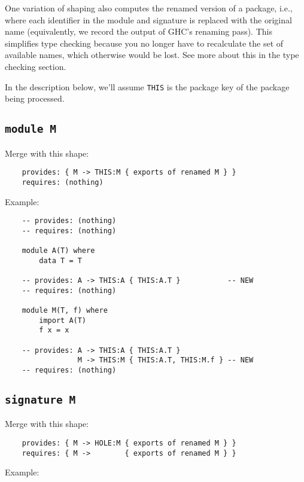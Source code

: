 \documentclass{article}
\begin{document}
One variation of shaping also computes the renamed version of a package,
i.e., where each identifier in the module and signature is replaced with
the original name (equivalently, we record the output of GHC's renaming
pass). This simplifies type checking because you no longer have to
recalculate the set of available names, which otherwise would be lost.
See more about this in the type checking section.

In the description below, we'll assume \verb|THIS| is the package key
of the package being processed.

\newpage

\subsection{\texttt{module M}}

Merge with this shape:

\begin{verbatim}
    provides: { M -> THIS:M { exports of renamed M } }
    requires: (nothing)
\end{verbatim}

\noindent Example:

\begin{verbatim}
    -- provides: (nothing)
    -- requires: (nothing)

    module A(T) where
        data T = T

    -- provides: A -> THIS:A { THIS:A.T }           -- NEW
    -- requires: (nothing)

    module M(T, f) where
        import A(T)
        f x = x

    -- provides: A -> THIS:A { THIS:A.T }
                 M -> THIS:M { THIS:A.T, THIS:M.f } -- NEW
    -- requires: (nothing)
\end{verbatim}

\newpage
\subsection{\texttt{signature M}}

Merge with this shape:

\begin{verbatim}
    provides: { M -> HOLE:M { exports of renamed M } }
    requires: { M ->        { exports of renamed M } }
\end{verbatim}

\noindent Example:
\end{document}
